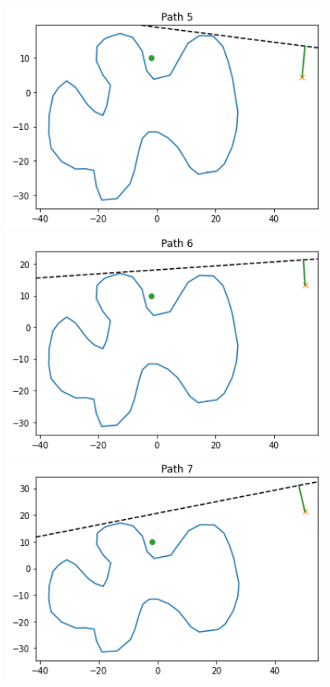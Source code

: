 \documentclass[11pt,landscape]{article}
\begin{document}
\begin{figure}[H]
\begin{mdframed}
\begin{center}
\begin{minipage}{0.3\textwidth}
                \includegraphics[width=0.95\textwidth]{p5.png}
            \end{minipage}
        \end{center}
        \begin{center}
            \begin{minipage}{0.3\textwidth}
                \includegraphics[width=0.95\textwidth]{p6.png}
            \end{minipage}
            \begin{minipage}{0.3\textwidth}
                \includegraphics[width=0.95\textwidth]{p7.png}

\end{minipage}
\end{center}
\end{mdframed}
\end{figure}
\end{document}
